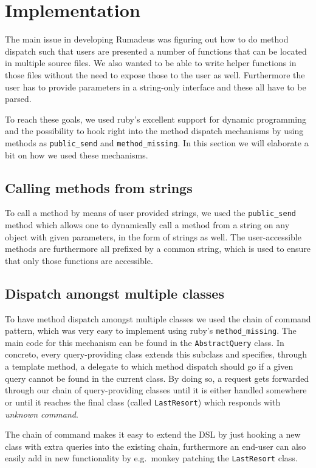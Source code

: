 \documentclass[11pt,pdftex,oneside]{article}
\begin{document}
\section{Implementation}

The main issue in developing Rumadeus was figuring out how to do method
dispatch such that users are presented a number of functions that can be
located in multiple source files.
We also wanted to be able to write helper functions in those files without
the need to expose those to the user as well.
Furthermore the user has to provide parameters in a string-only interface
and these all have to be parsed.

To reach these goals, we used ruby's excellent support for dynamic
programming and the possibility to hook right into the method dispatch
mechanisms by using methods as {\tt public\_send} and
{\tt method\_missing}.
In this section we will elaborate a bit on how we used these mechanisms.

\subsection{Calling methods from strings}
To call a method by means of user provided strings, we used the
{\tt public\_send} method which allows one to dynamically call a method
from a string on any object with given parameters, in the form of strings
as well.
The user-accessible methods are furthermore all prefixed by a common
string, which is used to ensure that only those functions are accessible.

\subsection{Dispatch amongst multiple classes}
To have method dispatch amongst multiple classes we used the chain of
command pattern, which was very easy to implement using ruby's
{\tt method\_missing}.
The main code for this mechanism can be found in the {\tt AbstractQuery}
class.
In concreto, every query-providing class extends this subclass and
specifies, through a template method, a delegate to which method dispatch
should go if a given query cannot be found in the current class.
By doing so, a request gets forwarded through our chain of query-providing
classes until it is either handled somewhere or until it reaches the final
class (called {\tt LastResort}) which responds with \emph{unknown
command}.

The chain of command makes it easy to extend the DSL by just hooking a new
class with extra queries into the existing chain, furthermore an end-user
can also easily add in new functionality by e.g.\ monkey patching the
{\tt LastResort} class.
\end{document}
